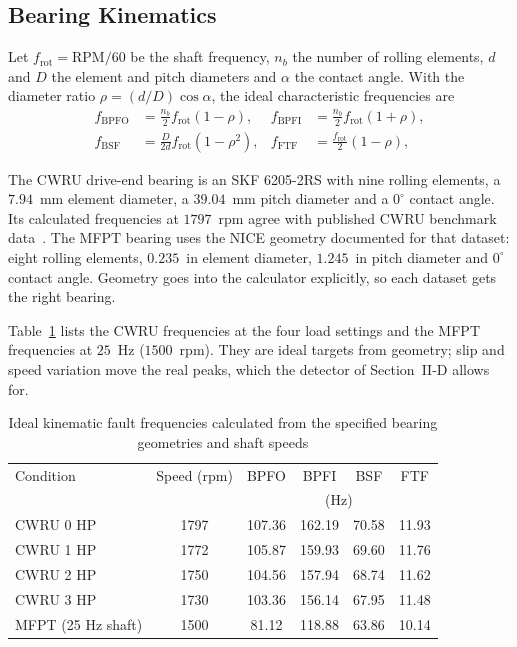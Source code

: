 \subsection{Bearing Kinematics}
Let $f_{\text{rot}}=\text{RPM}/60$ be the shaft frequency, $n_b$ the number of rolling
elements, $d$ and $D$ the element and pitch diameters and $\alpha$ the contact
angle. With the diameter ratio $\rho=(d/D)\cos\alpha$, the ideal
characteristic frequencies are
\begin{equation}
\begin{aligned}
  f_{\text{BPFO}} &= \frac{n_b}{2}f_{\text{rot}}\left(1-\rho\right), &
  f_{\text{BPFI}} &= \frac{n_b}{2}f_{\text{rot}}\left(1+\rho\right),\\
  f_{\text{BSF}} &= \frac{D}{2d}f_{\text{rot}}\left(1-\rho^{2}\right), &
  f_{\text{FTF}} &= \frac{f_{\text{rot}}}{2}\left(1-\rho\right),
\end{aligned}
  \label{eq:kinematics}
\end{equation}

The CWRU drive-end bearing is an SKF 6205-2RS with nine rolling elements, a
$7.94$~mm element diameter, a $39.04$~mm pitch diameter and a $0^\circ$
contact angle. Its calculated frequencies at $1797$~rpm agree with published
CWRU benchmark data~\cite{smith2015}. The MFPT bearing uses the NICE geometry
documented for that dataset: eight rolling elements, $0.235$~in element
diameter, $1.245$~in pitch diameter and $0^\circ$ contact angle. Geometry goes
into the calculator explicitly, so each dataset gets the right bearing.

Table~\ref{tab:kinematics} lists the CWRU frequencies at the four load settings
and the MFPT frequencies at $25$~Hz ($1500$~rpm). They are ideal targets from
geometry; slip and speed variation move the real peaks, which the detector of
Section~II-D allows for.

\begin{table}[!t]
\renewcommand{\arraystretch}{1.15}
\caption{Ideal kinematic fault frequencies calculated from the specified
bearing geometries and shaft speeds}
\label{tab:kinematics}
\centering
\footnotesize
\setlength{\tabcolsep}{4pt}
\begin{tabular}{lccccc}
\toprule
Condition & Speed (rpm) & BPFO & BPFI & BSF & FTF \\
          &             & \multicolumn{4}{c}{(Hz)} \\
\midrule
CWRU 0 HP & 1797 & 107.36 & 162.19 & 70.58 & 11.93 \\
CWRU 1 HP & 1772 & 105.87 & 159.93 & 69.60 & 11.76 \\
CWRU 2 HP & 1750 & 104.56 & 157.94 & 68.74 & 11.62 \\
CWRU 3 HP & 1730 & 103.36 & 156.14 & 67.95 & 11.48 \\
MFPT (25 Hz shaft) & 1500 & 81.12 & 118.88 & 63.86 & 10.14 \\
\bottomrule
\end{tabular}
\end{table}

